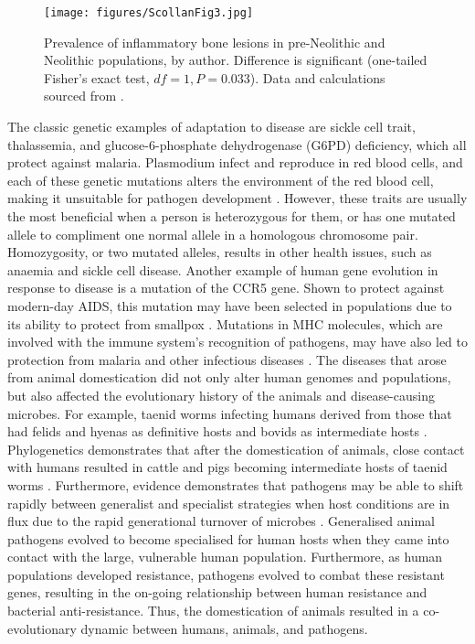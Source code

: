	\begin{wrapfigure}{O}{.5\textwidth}%
		\texttt{[image: figures/ScollanFig3.jpg]}
		\caption{Prevalence of inflammatory bone lesions in pre-Neolithic and Neolithic populations, by author. Difference is significant (one-tailed Fisher’s exact test, $df=1, P=0.033$). Data and calculations sourced from \cite{Eshed_2010}.}
		\label{fig:ScollanFig3} %
	\end{wrapfigure}
The classic genetic examples of adaptation to disease are sickle cell trait, thalassemia, and glucose-6-phosphate dehydrogenase (G6PD) deficiency, which all protect against malaria. 
Plasmodium infect and reproduce in red blood cells, and each of these genetic mutations alters the environment of the red blood cell, making it unsuitable for pathogen development \parencites[235]{Balter_2005}{Durham_1991}. However, these traits are usually the most beneficial when a person is heterozygous for them, or has one mutated allele to compliment one normal allele in a homologous chromosome pair. 
Homozygosity, or two mutated alleles, results in other health issues, such as anaemia and sickle cell disease. Another example of human gene evolution in response to disease is a mutation of the CCR5 gene. Shown to protect against modern-day AIDS, this mutation may have been selected in populations due to its ability to protect from smallpox \parencite[235]{Balter_2005}. 
Mutations in MHC molecules, which are involved with the immune system’s recognition of pathogens, may have also led to protection from malaria and other infectious diseases \parencite[2038]{Hill_2001}. 
The diseases that arose from animal domestication did not only alter human genomes and populations, but also affected the evolutionary history of the animals and disease-causing microbes. 
For example, taenid worms infecting humans derived from those that had felids and hyenas as definitive hosts and bovids as intermediate hosts \parencite[785--786]{Hoberg_2001}. 
Phylogenetics demonstrates that after the domestication of animals, close contact with humans resulted in cattle and pigs becoming intermediate hosts of taenid worms \parencites[376]{Pearce-Duvet_2006}{Schmidt_1989}. Furthermore, evidence demonstrates that pathogens may be able to shift rapidly between generalist and specialist strategies when host conditions are in flux due to the rapid generational turnover of 
microbes \parencite[539]{Wolinsky_1996}. 
Generalised animal pathogens evolved to become specialised for human hosts when they came into contact with the large, vulnerable human population. Furthermore, as human populations developed resistance, pathogens evolved to combat these resistant genes, resulting in the on-going relationship between human resistance and bacterial anti-resistance. 
Thus, the domestication of animals resulted in a co-evolutionary dynamic between humans, animals, and pathogens.

